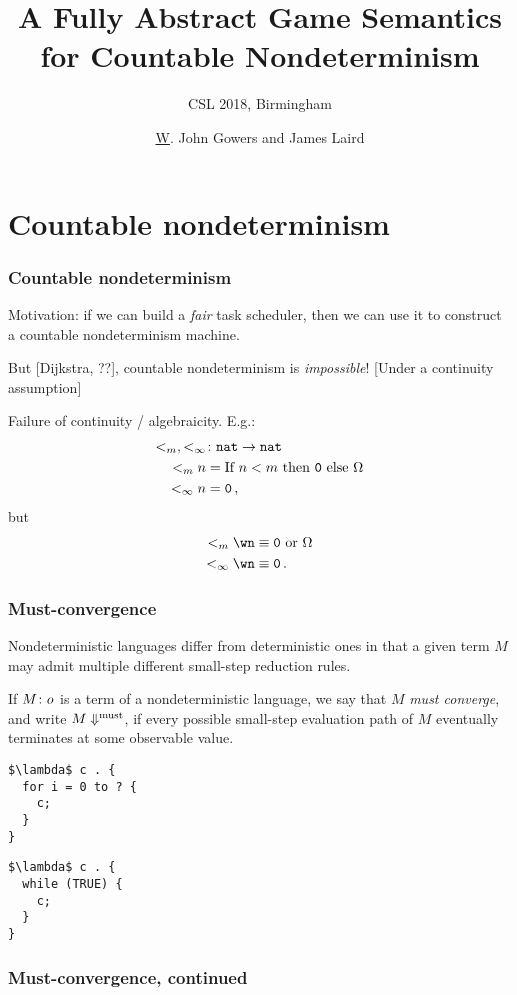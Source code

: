 \documentclass{beamer}
\title{A Fully Abstract Game Semantics for Countable Nondeterminism}
\subtitle{CSL 2018, Birmingham}
\author{{\ul W. John Gowers} and James Laird}
\begin{document}
\section{Countable nondeterminism}

\begin{frame}
  \frametitle{Countable nondeterminism}

  \pause

  Motivation: if we can build a \emph{fair} task scheduler, then we can use it to construct a countable nondeterminism machine.

  \pause

  But [Dijkstra, ??], countable nondeterminism is \emph{impossible}! \pause{} [Under a continuity assumption]

  \pause

  Failure of continuity / algebraicity.  
  E.g.:
  \begin{align*}
    <_m,<_\infty & \colon {\mathtt{nat}} \to {\mathtt{nat}} \\
    <_m n & = \text{If } n < m \text{ then } {\mathtt{0}} \text{ else }\Omega\\
    <_\infty n & = {\mathtt{0}}\,,
  \end{align*}
  but
  \begin{align*}
    <_m \wn & \equiv \0\text{ or }\Omega \\
    <_\infty \wn & \equiv \0\,.
  \end{align*}

\end{frame}

\begin{frame}[fragile]
  \frametitle{Must-convergence}

  Nondeterministic languages differ from deterministic ones in that a given term $M$ may admit multiple different small-step reduction rules.

  If $M\colon o$ is a term of a nondeterministic language, we say that $M$ \emph{must converge}, and write $M\Downarrow^{\text{must}}$, if every possible small-step evaluation path of $M$ eventually terminates at some observable value.

  \pause

  \begin{minipage}{0.5\textwidth}
    \begin{lstlisting}
$\lambda$ c . {
  for i = 0 to ? {
    c;
  }
}
    \end{lstlisting}
  \end{minipage}\pause\quad\begin{minipage}{0.3\textwidth}
    \begin{lstlisting}
$\lambda$ c . {
  while (TRUE) {
    c;
  }
}
    \end{lstlisting}
  \end{minipage}

\end{frame}

\begin{frame}
  \frametitle{Must-convergence, continued}
\end{frame}
\end{document}
